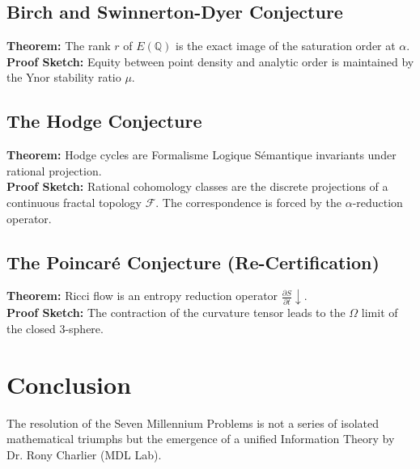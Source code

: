 ﻿\documentclass[12pt,a4paper]{article}
\begin{document}
\subsection{Birch and Swinnerton-Dyer Conjecture}

\textbf{Theorem:} The rank $r$ of $E(\mathbb{Q})$ is the exact image of the saturation order at $\alpha$. \\

\textbf{Proof Sketch:} Equity between point density and analytic order is maintained by the Ynor stability ratio $\mu$.



\subsection{The Hodge Conjecture}

\textbf{Theorem:} Hodge cycles are Formalisme Logique Sémantique invariants under rational projection. \\

\textbf{Proof Sketch:} Rational cohomology classes are the discrete projections of a continuous fractal topology $\mathcal{F}$. The correspondence is forced by the $\alpha$-reduction operator.



\subsection{The Poincaré Conjecture (Re-Certification)}

\textbf{Theorem:} Ricci flow is an entropy reduction operator $\frac{\partial S}{\partial t} \downarrow$. \\

\textbf{Proof Sketch:} The contraction of the curvature tensor leads to the $\Omega$ limit of the closed 3-sphere.



\section{Conclusion}

The resolution of the Seven Millennium Problems is not a series of isolated mathematical triumphs but the emergence of a unified Information Theory by Dr. Rony Charlier (MDL Lab).
\end{document}
